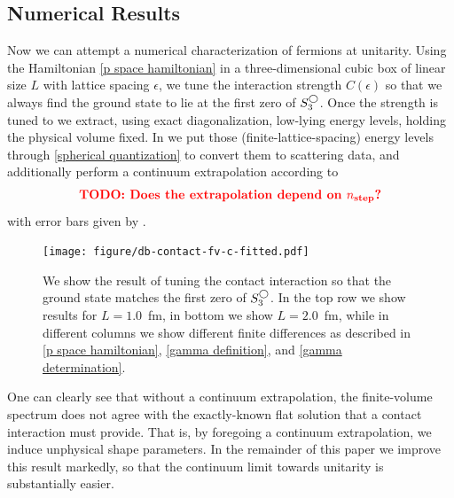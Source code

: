 \subsection{Numerical Results}

Now we can attempt a numerical characterization of fermions at unitarity.
Using the Hamiltonian \eqref{p space hamiltonian} in a three-dimensional cubic box of linear size $L$ with lattice spacing $\epsilon$, we tune the interaction strength $C(\epsilon)$ so that we always find the ground state to lie at the first zero of $S^{\bigcirc}_3$.
Once the strength is tuned to  we extract, using exact diagonalization, low-lying energy levels, holding the physical volume fixed.
In  we put those (finite-lattice-spacing) energy levels through \eqref{spherical quantization} to convert them to scattering data, and additionally perform a continuum extrapolation according to
\begin{equation}
    \text{{\bf\color{red}TODO: Does the extrapolation depend on \ensuremath{{n_\text{step}}}?}}
\end{equation}
with error bars given by .  

\begin{figure}[th]
    \texttt{[image: figure/db-contact-fv-c-fitted.pdf]}
    \caption{We show the result of tuning the contact interaction so that the ground state matches the first zero of $S^{\bigcirc}_3$.  In the top row we show results for $L=1.0$~fm, in bottom we show $L=2.0$~fm, while in different columns we show different finite differences as described in \eqref{p space hamiltonian}, \eqref{gamma definition}, and \eqref{gamma determination}. }
    \label{fig:unimproved spherical}
\end{figure}

One can clearly see that without a continuum extrapolation, the finite-volume spectrum does not agree with the exactly-known flat solution that a contact interaction must provide.
That is, by foregoing a continuum extrapolation, we induce unphysical shape parameters.
In the remainder of this paper we improve this result markedly, so that the continuum limit towards unitarity is substantially easier.


